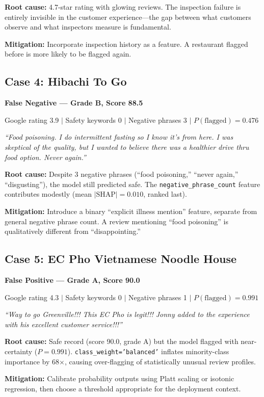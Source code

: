 \documentclass{article}
\begin{document}
\textbf{Root cause:} 4.7-star rating with glowing reviews. The inspection failure is entirely invisible in the customer experience---the gap between what customers observe and what inspectors measure is fundamental.

\textbf{Mitigation:} Incorporate inspection history as a feature. A restaurant flagged before is more likely to be flagged again.

\subsection{Case 4: Hibachi To Go}
\textbf{False Negative --- Grade B, Score 88.5}

Google rating 3.9 $|$ Safety keywords 0 $|$ Negative phrases 3 $|$ $P(\text{flagged}) = 0.476$

\textit{``Food poisoning. I do intermittent fasting so I know it's from here. I was skeptical of the quality, but I wanted to believe there was a healthier drive thru food option. Never again.''}

\textbf{Root cause:} Despite 3 negative phrases (``food poisoning,'' ``never again,'' ``disgusting''), the model still predicted safe. The \texttt{negative\_phrase\_count} feature contributes modestly (mean $|\text{SHAP}| = 0.010$, ranked last).

\textbf{Mitigation:} Introduce a binary ``explicit illness mention'' feature, separate from general negative phrase count. A review mentioning ``food poisoning'' is qualitatively different from ``disappointing.''

\subsection{Case 5: EC Pho Vietnamese Noodle House}
\textbf{False Positive --- Grade A, Score 90.0}

Google rating 4.3 $|$ Safety keywords 0 $|$ Negative phrases 1 $|$ $P(\text{flagged}) = 0.991$

\textit{``Way to go Greenville!!! This EC Pho is legit!!! Jonny added to the experience with his excellent customer service!!!''}

\textbf{Root cause:} Safe record (score 90.0, grade A) but the model flagged with near-certainty ($P=0.991$). \texttt{class\_weight='balanced'} inflates minority-class importance by 68$\times$, causing over-flagging of statistically unusual review profiles.

\textbf{Mitigation:} Calibrate probability outputs using Platt scaling or isotonic regression, then choose a threshold appropriate for the deployment context.
\end{document}
